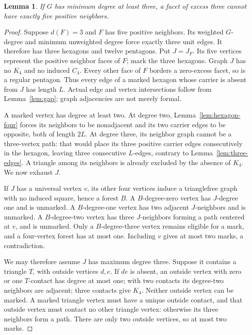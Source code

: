 \documentclass[11pt]{article}
\newtheorem{lemma}[theorem]{Lemma}
\theoremstyle{remark}
\begin{document}
\begin{lemma}\label{lem:five-neighbor-exclusion}
If $G$ has minimum degree at least three, a facet of excess three
cannot have exactly five positive neighbors.
\end{lemma}
\begin{proof}
Suppose $d(F)=3$ and $F$ has five positive neighbors. Its weighted
$G$-degree and minimum unweighted degree force exactly three unit
edges. It therefore has three hexagons and twelve pentagons.
Put $J=J_F$. Its five vertices
represent the positive neighbor faces of $F$; mark the three
hexagons. Graph $J$ has no $K_4$ and no induced $C_4$. Every other
face of $F$ borders a zero-excess facet, so is a regular pentagon.
Thus every edge of a marked hexagon whose carrier is absent from
$J$ has length $L$. Actual edge and vertex intersections follow
from Lemma~\ref{lem:gap}; graph adjacencies are not merely formal.

A marked vertex has degree at least two. At degree two,
Lemma~\ref{lem:hexagon-four} forces its neighbors to be nonadjacent
and its two carrier edges to be opposite, both of length $2L$.
At degree three, its neighbor graph cannot be a three-vertex path:
that would place its three positive carrier edges consecutively
in the hexagon, leaving three consecutive $L$-edges, contrary to
Lemma~\ref{lem:three-edges}. A triangle among its neighbors is
already excluded by the absence of $K_4$. We now exhaust $J$.

If $J$ has a universal vertex $v$, its other four vertices induce
a trianglefree graph with no induced square, hence a forest $B$.
A $B$-degree-zero vertex has $J$-degree one and is unmarked.
A $B$-degree-one vertex has two adjacent $J$-neighbors and is
unmarked. A $B$-degree-two vertex has three $J$-neighbors forming
a path centered at $v$, and is unmarked. Only a $B$-degree-three
vertex remains eligible for a mark, and a four-vertex forest has
at most one. Including $v$ gives at most two marks, a contradiction.

We may therefore assume $J$ has maximum degree three. Suppose
it contains a triangle $T$, with outside vertices $d,e$. If $de$
is absent, an outside vertex with zero or one $T$-contact has
degree at most one; with two contacts its degree-two neighbors
are adjacent; three contacts give $K_4$. Neither outside vertex
can be marked. A marked triangle vertex must have a unique
outside contact, and that outside vertex must contact no other
triangle vertex: otherwise its three neighbors form a path.
There are only two outside vertices, so at most two marks.


\end{proof}
\end{document}
